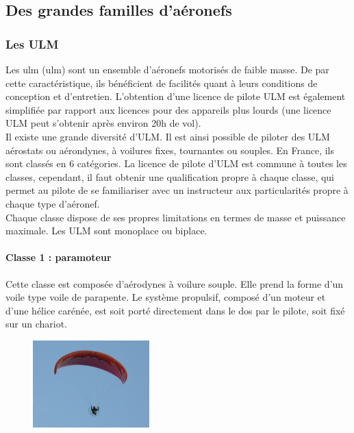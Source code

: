 \subsection{Des grandes familles d'aéronefs}		
\subsubsection{Les ULM}

Les \acrshort{ulm} (\acrlong{ulm})  sont un ensemble d'aéronefs motorisés de faible masse. De par cette caractéristique, ils bénéficient de facilités quant à leurs conditions de conception et d'entretien. L'obtention d'une licence de pilote ULM est également simplifiée par rapport aux licences pour des appareils plus lourds (une licence ULM peut s'obtenir après environ 20h de vol). \\

Il existe une grande diversité d'ULM. Il est ainsi possible de piloter des ULM aérostats ou aérondynes, à voilures fixes, tournantes ou souples. En France, ils sont classés en 6 catégories. La licence de pilote d'ULM est commune à toutes les classes, cependant, il faut obtenir une qualification propre à chaque classe, qui permet au pilote de se familiariser avec un instructeur aux particularités propre à chaque type d'aéronef. \\

Chaque classe dispose de ses propres limitations en termes de masse et puissance maximale. Les ULM sont monoplace ou biplace.

	\paragraph{Classe 1 : paramoteur}

	Cette classe est composée d'aérodynes à voilure souple. Elle prend la forme d'un voile type voile de parapente. Le système propulsif, composé d'un moteur et d'une hélice carénée, est soit porté directement dans le dos par le pilote, soit fixé sur un chariot.  
	
	\begin{figure}[H]
  	\centering
    \includegraphics[width=0.4\textwidth]{01-EtudeAeronefs/img/ULM_Classe_1.jpg}
	\end{figure}	
	
